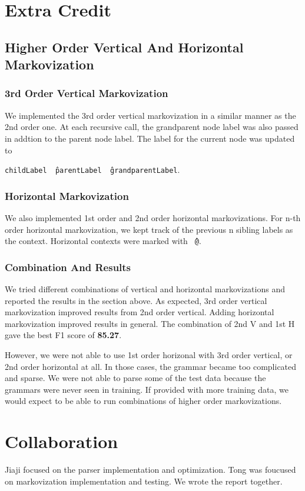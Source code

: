 \documentclass[12pt]{article}
\begin{document}
\section{Extra Credit}
\subsection{Higher Order Vertical And Horizontal Markovization}
\subsubsection{3rd Order Vertical Markovization}
We implemented the 3rd order vertical markovization in a similar manner as the 2nd order one. At each recursive call, the grandparent node label was also passed in addtion to the parent node label. The label for the current node was updated to

\texttt{childLabel \^\ parentLabel \^\ grandparentLabel}. 
\subsubsection{Horizontal Markovization}
We also implemented 1st order and 2nd order horizontal markovizations. For n-th order horizontal markovization, we kept track of the previous n sibling labels as the context. Horizontal contexts were marked with \texttt{\^\ @}.

\subsubsection{Combination And Results}
We tried different combinations of vertical and horizontal markovizations and reported the results in the section above. As expected, 3rd order vertical markovization improved results from 2nd order vertical. Adding horizontal markovization improved results in general. The combination of 2nd V and 1st H gave the best F1 score of \textbf{85.27}.

However, we were not able to use 1st order horizonal with 3rd order vertical, or 2nd order horizontal at all. In those cases, the grammar became too complicated and sparse. We were not able to parse some of the test data because the grammars were never seen in training. If provided with more training data, we would expect to be able to run combinations of higher order markovizations.

\section{Collaboration} 
Jiaji focused on the parser implementation and optimization. Tong was foucused on markovization implementation and testing. We wrote the report together.
\end{document}
